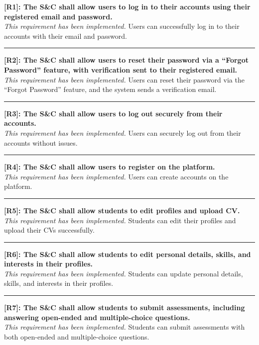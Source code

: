 \noindent\textbf{[R1]: The S\&C shall allow users to log in to their accounts using their registered email and password.} \\
\textit{This requirement has been implemented.} Users can successfully log in to their accounts with their email and password.

\noindent\rule{16cm}{0.4pt}

\noindent\textbf{[R2]: The S\&C shall allow users to reset their password via a “Forgot Password” feature, with verification sent to their registered email.} \\
\textit{This requirement has been implemented.} Users can reset their password via the “Forgot Password” feature, and the system sends a verification email.

\noindent\rule{16cm}{0.4pt}

\noindent\textbf{[R3]: The S\&C shall allow users to log out securely from their accounts.} \\
\textit{This requirement has been implemented.} Users can securely log out from their accounts without issues.

\noindent\rule{16cm}{0.4pt}

\noindent\textbf{[R4]: The S\&C shall allow users to register on the platform.} \\
\textit{This requirement has been implemented.} Users can create accounts on the platform.

\noindent\rule{16cm}{0.4pt}

\noindent\textbf{[R5]: The S\&C shall allow students to edit profiles and upload CV.} \\
\textit{This requirement has been implemented.} Students can edit their profiles and upload their CVs successfully.

\noindent\rule{16cm}{0.4pt}

\noindent\textbf{[R6]: The S\&C shall allow students to edit personal details, skills, and interests in their profiles.} \\
\textit{This requirement has been implemented.} Students can update personal details, skills, and interests in their profiles.

\noindent\rule{16cm}{0.4pt}

\noindent\textbf{[R7]: The S\&C shall allow students to submit assessments, including answering open-ended and multiple-choice questions.} \\
\textit{This requirement has been implemented.} Students can submit assessments with both open-ended and multiple-choice questions.

